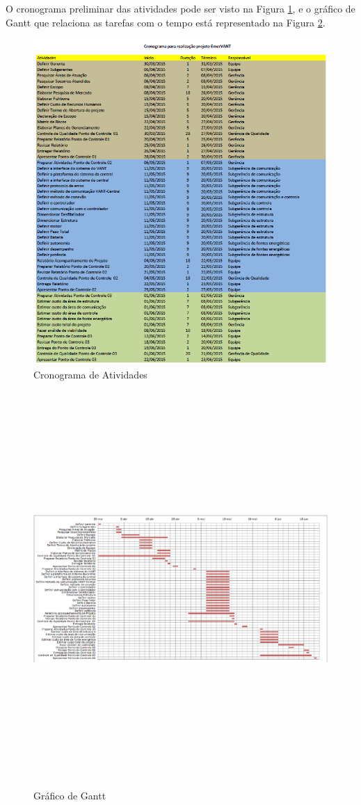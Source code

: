 O cronograma preliminar das atividades pode ser visto na Figura \ref{fig:cronograma}, e o
gráfico de Gantt que relaciona as tarefas com o tempo está representado na Figura \ref{fig:gantt}. 
\vfill
 \begin{figure}[h!]
	\centering
		\includegraphics[keepaspectratio=true,scale=0.9]{figuras/cronograma.png}
	\caption{Cronograma de Atividades}
	\label{fig:cronograma}
\end{figure}

\pagebreak
 \begin{figure}[h!]
	\centering
		\includegraphics[height=15cm,width=18cm]{figuras/gantt.png}
	\caption{Gráfico de Gantt}
	\label{fig:gantt}
\end{figure}
